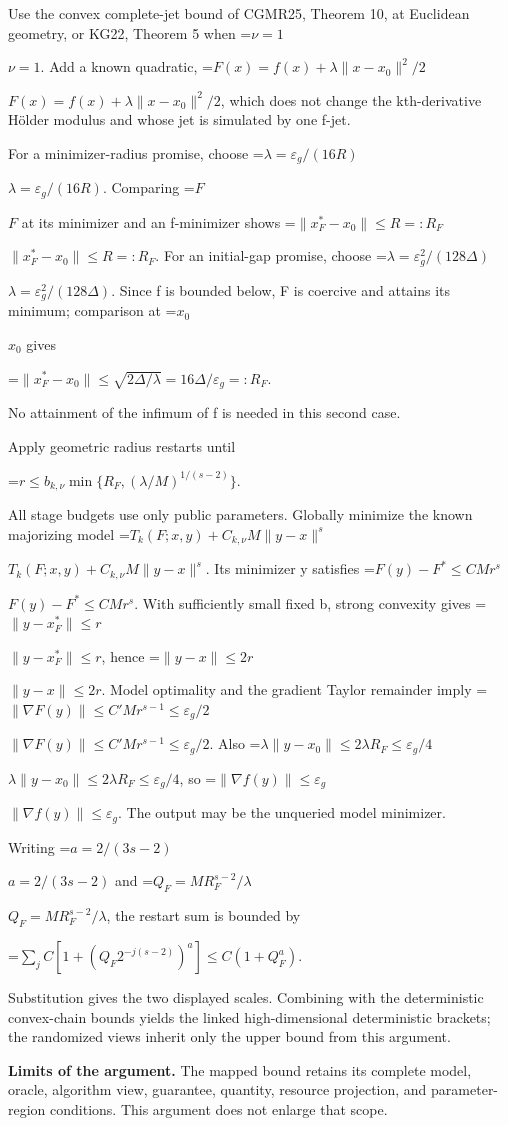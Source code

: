 \documentclass[10pt,a4paper]{article}
\newcommand{\AtlasMath}[1]{\par\begingroup\centering\setbox0=\hbox{$\displaystyle #1$}\ifdim\wd0>1.4\linewidth\typeout{ATLAS WIDE FORMULA: \the\wd0}\fi\ifdim\wd0>\linewidth\resizebox{\linewidth}{!}{\box0}\else\box0\fi\par\endgroup}
\newcommand{\AtlasInlineMath}[1]{\begingroup\setbox0=\hbox{$#1$}\ifdim\wd0>.4\linewidth\endgroup\AtlasMath{#1}\else\endgroup$#1$\fi}
\begin{document}
Use the convex complete-jet bound of CGMR25, Theorem 10, at Euclidean geometry, or KG22, Theorem 5 when \AtlasInlineMath{\nu=1}. Add a known quadratic, \AtlasInlineMath{F(x)=f(x)+\lambda\|x-x_0\|^2/2}, which does not change the kth-derivative Hölder modulus and whose jet is simulated by one f-jet.

For a minimizer-radius promise, choose \AtlasInlineMath{\lambda=\varepsilon_g/(16R)}. Comparing \AtlasInlineMath{F} at its minimizer and an f-minimizer shows \AtlasInlineMath{\|x_F^*-x_0\|\le R=:R_F}. For an initial-gap promise, choose \AtlasInlineMath{\lambda=\varepsilon_g^2/(128\Delta)}. Since f is bounded below, F is coercive and attains its minimum; comparison at \AtlasInlineMath{x_0} gives

\AtlasMath{\|x_F^*-x_0\|\le\sqrt{2\Delta/\lambda}=16\Delta/\varepsilon_g=:R_F.}

No attainment of the infimum of f is needed in this second case.

Apply geometric radius restarts until

\AtlasMath{r\le b_{k,\nu}\min\{R_F,(\lambda/M)^{1/(s-2)}\}.}

All stage budgets use only public parameters. Globally minimize the known majorizing model \AtlasInlineMath{T_k(F;x,y)+C_{k,\nu}M\|y-x\|^s}. Its minimizer y satisfies \AtlasInlineMath{F(y)-F^*\le CMr^s}. With sufficiently small fixed b, strong convexity gives \AtlasInlineMath{\|y-x_F^*\|\le r}, hence \AtlasInlineMath{\|y-x\|\le2r}. Model optimality and the gradient Taylor remainder imply \AtlasInlineMath{\|\nabla F(y)\|\le C'Mr^{s-1}\le\varepsilon_g/2}. Also \AtlasInlineMath{\lambda\|y-x_0\|\le2\lambda R_F\le\varepsilon_g/4}, so \AtlasInlineMath{\|\nabla f(y)\|\le\varepsilon_g}. The output may be the unqueried model minimizer.

Writing \AtlasInlineMath{a=2/(3s-2)} and \AtlasInlineMath{Q_F=MR_F^{s-2}/\lambda}, the restart sum is bounded by

\AtlasMath{\sum_j C[1+(Q_F2^{-j(s-2)})^a]\le C(1+Q_F^a).}

Substitution gives the two displayed scales. Combining with the deterministic convex-chain bounds yields the linked high-dimensional deterministic brackets; the randomized views inherit only the upper bound from this argument.

\textbf{Limits of the argument.} The mapped bound retains its complete model, oracle, algorithm view, guarantee, quantity, resource projection, and parameter-region conditions. This argument does not enlarge that scope.
\end{document}

